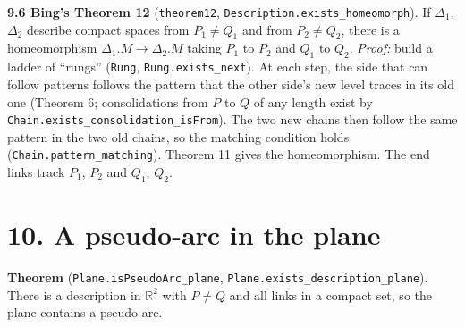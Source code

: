 \documentclass[11pt]{article}
\newcommand{\lean}[1]{\texttt{#1}}
\begin{document}
\textbf{9.6 Bing's Theorem 12} (\lean{theorem12}, \lean{Description.\hspace{0pt}exists\_\hspace{0pt}homeomorph}). If $\Delta_1$, $\Delta_2$ describe compact spaces from $P_1 \neq Q_1$ and from $P_2 \neq Q_2$, there is a homeomorphism $\Delta_1$.$M \to \Delta_2$.$M$ taking $P_1$ to $P_2$ and $Q_1$ to $Q_2$. \emph{Proof:} build a ladder of ``rungs'' (\lean{Rung}, \lean{Rung.\hspace{0pt}exists\_\hspace{0pt}next}). At each step, the side that can follow patterns follows the pattern that the other side's new level traces in its old one (Theorem 6; consolidations from $P$ to $Q$ of any length exist by \lean{Chain.\hspace{0pt}exists\_\hspace{0pt}consolidation\_\hspace{0pt}isFrom}). The two new chains then follow the same pattern in the two old chains, so the matching condition holds (\lean{Chain.\hspace{0pt}pattern\_\hspace{0pt}matching}). Theorem 11 gives the homeomorphism. The end links track $P_1$, $P_2$ and $Q_1$, $Q_2$.

\section*{10. A pseudo-arc in the plane}

\textbf{Theorem} (\lean{Plane.\hspace{0pt}isPseudoArc\_\hspace{0pt}plane}, \lean{Plane.\hspace{0pt}exists\_\hspace{0pt}description\_\hspace{0pt}plane}). There is a description in $\mathbb{R}^2$ with $P \neq Q$ and all links in a compact set, so the plane contains a pseudo-arc.
\end{document}
